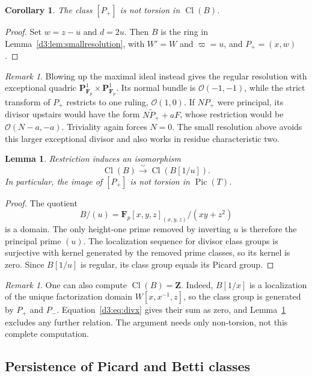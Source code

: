 \documentclass[11pt,a4paper]{amsart}
\numberwithin{equation}{section}
\newtheorem{lemma}[theorem]{Lemma}
\newtheorem{corollary}[theorem]{Corollary}
\theoremstyle{definition}
\theoremstyle{remark}
\newtheorem{remark}[theorem]{Remark}
\newcommand{\Z}{\mathbf Z}
\newcommand{\F}{\mathbf F}
\newcommand{\PP}{\mathbf P}
\newcommand{\OO}{\mathcal O}
\newcommand{\Pic}{\operatorname{Pic}}
\newcommand{\Cl}{\operatorname{Cl}}
\begin{document}
\begin{corollary}\label{d3:lem:clnonzero}
The class $[P_+]$ is not torsion in $\Cl(B)$.
\end{corollary}
\begin{proof}
Set $w=z-u$ and $d=2u$. Then $B$ is the ring in Lemma~\ref{d3:lem:smallresolution}, with $W'=W$ and $\varpi=u$, and $P_+=(x,w)$.
\end{proof}

\begin{remark}
Blowing up the maximal ideal instead gives the regular resolution with exceptional quadric $\PP^1_{\F_p}\times\PP^1_{\F_p}$. Its normal bundle is $\OO(-1,-1)$, while the strict transform of $P_+$ restricts to one ruling, $\OO(1,0)$. If $NP_+$ were principal, its divisor upstairs would have the form $N\widetilde P_++aF$, whose restriction would be $\OO(N-a,-a)$. Triviality again forces $N=0$. The small resolution above avoids this larger exceptional divisor and also works in residue characteristic two.
\end{remark}

\begin{lemma}\label{d3:lem:invertu}
Restriction induces an isomorphism
\[
\Cl(B)\xrightarrow{\sim}\Cl(B[1/u]).
\]
In particular, the image of $[P_+]$ is not torsion in $\Pic(T)$.
\end{lemma}
\begin{proof}
The quotient
\[
B/(u)=\F_p[x,y,z]_{(x,y,z)}/(xy+z^2)
\]
is a domain. The only height-one prime removed by inverting $u$ is therefore the principal prime $(u)$. The localization sequence for divisor class groups is surjective with kernel generated by the removed prime classes, so its kernel is zero. Since $B[1/u]$ is regular, its class group equals its Picard group.
\end{proof}

\begin{remark}
One can also compute $\Cl(B)=\Z$. Indeed, $B[1/x]$ is a localization of the unique factorization domain $W[x,x^{-1},z]$, so the class group is generated by $P_+$ and $P_-$. Equation~\eqref{d3:eq:divx} gives their sum as zero, and Lemma~\ref{d3:lem:clnonzero} excludes any further relation. The argument needs only non-torsion, not this complete computation.
\end{remark}

\subsection{Persistence of Picard and Betti classes}\label{d3:sec:persistence}
\end{document}
